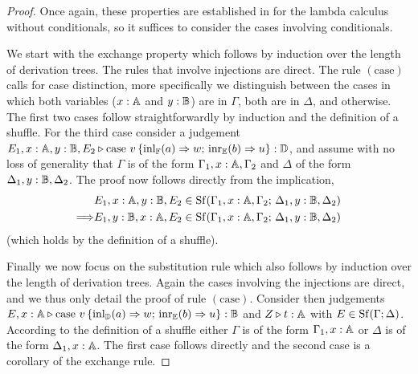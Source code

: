 \begin{proof}
  Once again, these properties are established in \cite[Theorem 2.1]{dahlqvist2023syntactic} for the lambda calculus without conditionals, so it suffices to consider the cases involving conditionals.

  We start with the exchange property which follows by induction over the length
of derivation trees. The rules that involve injections are direct.  The rule
$(\text{case})$ calls for case distinction, more specifically we  distinguish
between the cases in which both variables ($x : \mathbb{A}$ and $y : \mathbb{B}$) are
in $\Gamma$, both are in $\Delta$, and otherwise. The first two cases follow
straightforwardly by induction and the definition of a shuffle. For the third
case consider a judgement $E_1,x : \mathbb{A}, y : \mathbb{B}, E_2 \triangleright \text{case }
v\, \{\mathrm{inl}_{\mathbb{F}}(a) \Rightarrow w ; \, \mathrm{inr}_{\mathbb{E}}(b) \Rightarrow u \}:
\mathbb{D}$, and assume with no loss of generality that $\Gamma$ is of the form
$\Gamma_1, x : \mathbb{A}, \Gamma_2$ and $\Delta$ of the form $\Delta_1, y :
\mathbb{B}, \Delta_2$. The proof now follows directly from the implication,
\begin{align*}
        & E_1, x : \mathbb{A}, y : \mathbb{B}, E_2 \in \mathrm{Sf}(\Gamma_1, x : \mathbb{A}, \Gamma_2 ; \,
        \Delta_1, y : \mathbb{B}, \Delta_2) \\
        \Longrightarrow &
        E_1, y : \mathbb{B}, x : \mathbb{A}, E_2 \in \mathrm{Sf}(\Gamma_1, x : \mathbb{A}, \Gamma_2 ; \,
        \Delta_1, y : \mathbb{B}, \Delta_2)
\end{align*}
(which holds by the definition of a shuffle).

Finally we now focus on the substitution rule which also follows by induction over the
length of derivation trees. Again the cases involving the injections are direct,
and we thus only detail the proof of rule $(\text{case})$. Consider then
judgements $E,x : \mathbb{A} \triangleright \text{case } v\, \{\mathrm{inl}_{\mathbb{D}}(a) \Rightarrow
w ; \, \mathrm{inr}_{\mathbb{E}}(b) \Rightarrow u \}: \mathbb{B}$ and
$Z \triangleright t : \mathbb{A}$ with $E \in \mathrm{Sf}(\Gamma; \Delta)$. According to the definition
of a shuffle either $\Gamma$ is of the form $\Gamma_1, x: \mathbb{A}$ or $\Delta$ is
of the form $\Delta_1, x : \mathbb{A}$. The first case follows directly and the second case
is a corollary of the exchange rule.
\end{proof}
 


